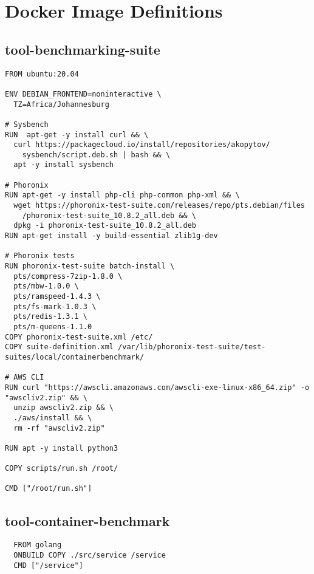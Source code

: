 \chapter{Docker Image Definitions}
\label{appendix:docker_images}

\section{tool-benchmarking-suite}

\begin{verbatim}
FROM ubuntu:20.04

ENV DEBIAN_FRONTEND=noninteractive \
  TZ=Africa/Johannesburg

# Sysbench
RUN  apt-get -y install curl && \
  curl https://packagecloud.io/install/repositories/akopytov/
    sysbench/script.deb.sh | bash && \
  apt -y install sysbench

# Phoronix 
RUN apt-get -y install php-cli php-common php-xml && \ 
  wget https://phoronix-test-suite.com/releases/repo/pts.debian/files
    /phoronix-test-suite_10.8.2_all.deb && \
  dpkg -i phoronix-test-suite_10.8.2_all.deb
RUN apt-get install -y build-essential zlib1g-dev 

# Phoronix tests
RUN phoronix-test-suite batch-install \
  pts/compress-7zip-1.8.0 \
  pts/mbw-1.0.0 \ 
  pts/ramspeed-1.4.3 \ 
  pts/fs-mark-1.0.3 \ 
  pts/redis-1.3.1 \ 
  pts/m-queens-1.1.0 
COPY phoronix-test-suite.xml /etc/
COPY suite-definition.xml /var/lib/phoronix-test-suite/test-suites/local/containerbenchmark/

# AWS CLI
RUN curl "https://awscli.amazonaws.com/awscli-exe-linux-x86_64.zip" -o "awscliv2.zip" && \
  unzip awscliv2.zip && \
  ./aws/install && \
  rm -rf "awscliv2.zip"

RUN apt -y install python3

COPY scripts/run.sh /root/

CMD ["/root/run.sh"]
\end{verbatim}

\section{tool-container-benchmark}
\begin{verbatim}
  FROM golang
  ONBUILD COPY ./src/service /service
  CMD ["/service"]
\end{verbatim}